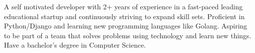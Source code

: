 

\begin{cvparagraph}

\vspace{1mm}
A self motivated developer with 2+ years of experience in a fast-paced leading educational startup
and continuously striving to expand skill sets. Proficient in Python/Django and learning new programming languages like Golang.
Aspiring to be part of a team that solves problems using technology and learn new things. Have a bachelor’s degree in Computer Science.
\end{cvparagraph}
